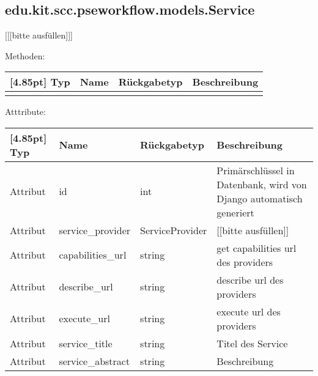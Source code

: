 		\subsection{edu.kit.scc.pseworkflow.models.Service}
			[[[bitte ausfüllen]]]
			
			Methoden:
			\begin{center}
				\setlength\tabcolsep{5pt}
				\renewcommand{\arraystretch}{1.5}
				
				\begin{tabularx}{\textwidth}{|l|l|l|X|}
					\hline
					\rowcolor[gray]{0.75}[4.85pt]
					Typ & Name & Rückgabetyp & Beschreibung \\ \hline 
					&&& \\
					\hline
				\end{tabularx}
			\end{center}
			
			Atttribute:
			\begin{center}
				\setlength\tabcolsep{5pt}
				\renewcommand{\arraystretch}{1.5}
				
				\begin{tabularx}{\textwidth}{|l|l|l|X|}
					\hline
					\rowcolor[gray]{0.75}[4.85pt]
					Typ & Name & Rückgabetyp & Beschreibung \\ \hline 
					Attribut & id & int & Primärschlüssel in Datenbank, wird von Django automatisch generiert \\ \hline
					Attribut & service\_provider & ServiceProvider & [[bitte ausfüllen]] \\ \hline
					Attribut & capabilities\_url & string & get capabilities url des providers \\ \hline
					Attribut & describe\_url & string & describe url des providers \\ \hline
					Attribut & execute\_url & string & execute url des providers \\ \hline
					Attribut & service\_title & string & Titel des Service \\ \hline
					Attribut & service\_abstract & string & Beschreibung \\
					\hline
				\end{tabularx}
			\end{center}
		
